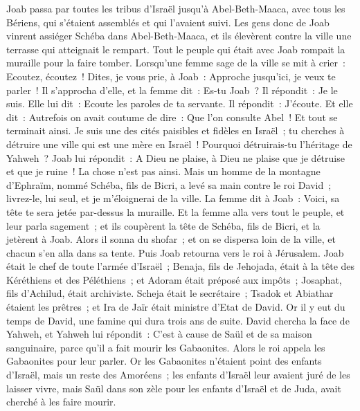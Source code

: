 \begin{multicols}{2}
Joab passa par toutes les tribus d'Israël jusqu'à Abel-Beth-Maaca, avec tous les Bériens, qui s'étaient assemblés et qui l'avaient suivi.
Les gens donc de Joab vinrent assiéger Schéba dans Abel-Beth-Maaca, et ils élevèrent contre la ville une terrasse qui atteignait le rempart. Tout le peuple qui était avec Joab rompait la muraille pour la faire tomber.
Lorsqu'une femme sage de la ville se mit à crier~: Ecoutez, écoutez~! Dites, je vous prie, à Joab~: Approche jusqu'ici, je veux te parler~!
Il s'approcha d'elle, et la femme dit~: Es-tu Joab~? Il répondit~: Je le suis. Elle lui dit~: Ecoute les paroles de ta servante. Il répondit~: J'écoute.
Et elle dit~: Autrefois on avait coutume de dire~: Que l'on consulte Abel~! Et tout se terminait ainsi.
Je suis une des cités paisibles et fidèles en Israël~; tu cherches à détruire une ville qui est une mère en Israël~! Pourquoi détruirais-tu l'héritage de Yahweh~?
Joab lui répondit~: A Dieu ne plaise, à Dieu ne plaise que je détruise et que je ruine~!
La chose n'est pas ainsi. Mais un homme de la montagne d'Ephraïm, nommé Schéba, fils de Bicri, a levé sa main contre le roi David~; livrez-le, lui seul, et je m'éloignerai de la ville. La femme dit à Joab~: Voici, sa tête te sera jetée par-dessus la muraille.
Et la femme alla vers tout le peuple, et leur parla sagement~; et ils coupèrent la tête de Schéba, fils de Bicri, et la jetèrent à Joab. Alors il sonna du shofar~; et on se dispersa loin de la ville, et chacun s'en alla dans sa tente. Puis Joab retourna vers le roi à Jérusalem.
Joab était le chef de toute l'armée d'Israël~; Benaja, fils de Jehojada, était à la tête des Kéréthiens et des Péléthiens~;
et Adoram était préposé aux impôts~; Josaphat, fils d'Achilud, était archiviste.
Scheja était le secrétaire~; Tsadok et Abiathar étaient les prêtres~;
et Ira de Jaïr était ministre d'Etat de David.
\VerseOne{}Or il y eut du temps de David, une famine qui dura trois ans de suite. David chercha la face de Yahweh, et Yahweh lui répondit~: C'est à cause de Saül et de sa maison sanguinaire, parce qu'il a fait mourir les Gabaonites.
Alors le roi appela les Gabaonites pour leur parler. Or les Gabaonites n'étaient point des enfants d'Israël, mais un reste des Amoréens~; les enfants d'Israël leur avaient juré de les laisser vivre, mais Saül dans son zèle pour les enfants d'Israël et de Juda, avait cherché à les faire mourir.

\end{multicols}
